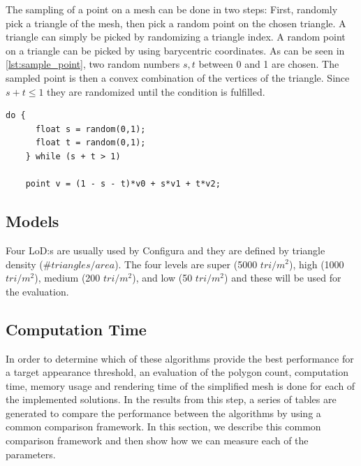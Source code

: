 The sampling of a point on a mesh can be done in two steps: First, randomly pick a triangle of the mesh, then pick a random point on the chosen triangle. A triangle can simply be picked by randomizing a triangle index. A random point on a triangle can be picked by using barycentric coordinates. As can be seen in \cref{lst:sample_point}, two random numbers \(s, t\) between 0 and 1 are chosen. The sampled point is then a convex combination of the vertices of the triangle. Since \(s + t \leq 1\) they are randomized until the condition is fulfilled.  

\begin{minipage}{\linewidth}
  \begin{lstlisting}[caption={Sampling point on triangle by using barycentric coordinates}, label={lst:sample_point}]
    do {
      float s = random(0,1);
      float t = random(0,1);
    } while (s + t > 1)

    point v = (1 - s - t)*v0 + s*v1 + t*v2;
  \end{lstlisting}
\end{minipage}

\subsection{Models}
Four LoD:s are usually used by Configura and they are defined by triangle density ($\#triangles/area$). The four levels are super (5000 $tri/m^2$), high (1000 $tri/m^2$), medium (200 $tri/m^2$), and low  (50 $tri/m^2$) and these will be used for the evaluation.

\subsection{Computation Time}


\iffalse
In order to determine which of these algorithms provide the best performance for a target appearance threshold, an evaluation of the polygon count, computation time, memory usage and rendering time of the simplified mesh is done for each of the implemented solutions. In the results from this step, a series of tables are generated to compare the performance between the algorithms by using a common comparison framework. In this section, we describe this common comparison framework and then show how we can measure each of the parameters.

